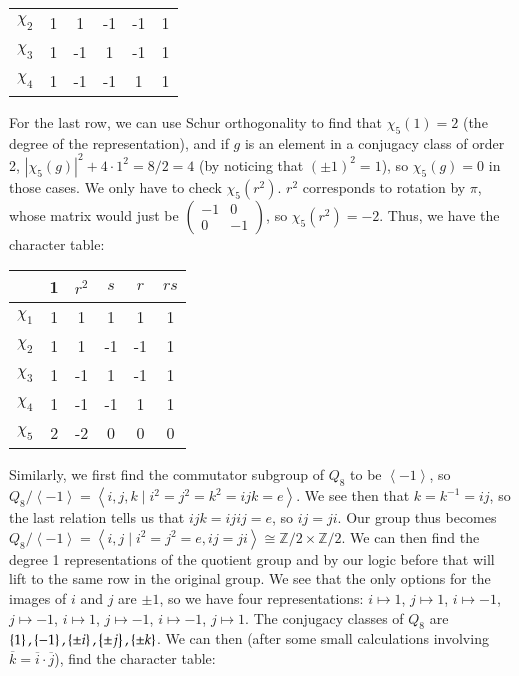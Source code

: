 \documentclass[12pt]{article}
\theoremstyle{definitionstyle}
\def\mbb#1{\mathbb{#1}}
\newcommand{\SET}[1]{\Set{\mskip-\medmuskip #1 \mskip-\medmuskip}}
\newcommand{\Z}{\mbb Z}
\newcommand{\gen}[1]{\left\langle #1 \right\rangle}
\begin{document}
\begin{enumerate}
\begin{center}
\begin{tabular}{c|ccccc}
                $\chi_2$ & 1 & 1 & -1 & -1 & 1 \\
                $\chi_3$ & 1 & -1 & 1 & -1 & 1 \\
                $\chi_4$ & 1 & -1 & -1 & 1 & 1
            \end{tabular}
        \end{center}
        For the last row, we can use Schur orthogonality to find that $\chi_5(1) = 2$ (the degree of the representation), and if $g$ is an element in a conjugacy class of order 2, $|\chi_5(g)|^2 + 4 \cdot 1^2 = 8/2 = 4$ (by noticing that $(\pm 1)^2 = 1$), so $\chi_5(g) = 0$ in those cases. We only have to check $\chi_5(r^2)$. $r^2$ corresponds to rotation by $\pi$, whose matrix would just be $\begin{pmatrix} -1 & 0 \\ 0 & -1 \end{pmatrix}$, so $\chi_5(r^2) = -2$. Thus, we have the character table:
            \begin{center}
                \begin{tabular}{c|ccccc}
                    & 1 & $r^2$ & $s$ & $r$ & $rs$ \\
                    \hline
                    $\chi_1$ & 1 & 1 & 1 & 1 & 1 \\
                    $\chi_2$ & 1 & 1 & -1 & -1 & 1 \\
                    $\chi_3$ & 1 & -1 & 1 & -1 & 1 \\
                    $\chi_4$ & 1 & -1 & -1 & 1 & 1 \\
                    $\chi_5$ & 2 & -2 & 0 & 0 & 0
                \end{tabular}
            \end{center}
        Similarly, we first find the commutator subgroup of $Q_8$ to be $\gen{-1}$, so $Q_8/\gen{-1} = \gen{i,j,k \mid i^2=j^2=k^2=ijk=e}$. We see then that $k = k^{-1} = ij$, so the last relation tells us that $ijk = ijij = e$, so $ij = ji$. Our group thus becomes $Q_8/\gen{-1} = \gen{i,j \mid i^2=j^2=e, ij=ji} \cong \Z/2 \times \Z/2$. We can then find the degree 1 representations of the quotient group and by our logic before that will lift to the same row in the original group. We see that the only options for the images of $i$ and $j$ are $\pm 1$, so we have four representations: $i \mapsto 1$, $j \mapsto 1$, $i \mapsto -1$, $j \mapsto -1$, $i \mapsto 1$, $j \mapsto -1$, $i \mapsto -1$, $j \mapsto 1$. The conjugacy classes of $Q_8$ are $\SET{1}, \SET{-1}, \SET{\pm i}, \SET{\pm j}, \SET{\pm k}$. We can then (after some small calculations involving $\overline k = \overline i \cdot \overline j$), find the character table:

\end{enumerate}
\end{document}
